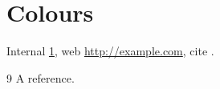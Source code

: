 \documentclass{article}
\begin{document}
\section{Colours}\label{sec:c}
Internal \ref{sec:c}, web \url{http://example.com}, cite \cite{key}.
\begin{thebibliography}{9}
 A reference.
\end{thebibliography}
\end{document}
